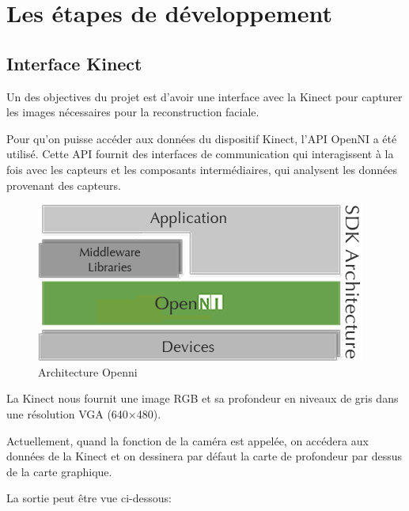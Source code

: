 \documentclass[a4paper,11pt]{article}
\begin{document}
\section{Les étapes de développement}
\subsection*{Interface Kinect}

Un des objectives du projet est d’avoir une interface avec la Kinect pour capturer les images nécessaires pour la reconstruction faciale.

Pour qu’on puisse accéder aux données du dispositif Kinect, l’API OpenNI\cite{Openni2010} a été utilisé. Cette API fournit des interfaces de communication qui interagissent à la fois avec les capteurs et les composants intermédiaires, qui analysent les données provenant des capteurs.

\begin{figure}[h!]
  \begin{center}
    \includegraphics[scale=0.4]{img/image03.png}
    \caption{Architecture Openni}
  \end{center}
\end{figure}


La Kinect nous fournit une image RGB et sa profondeur en niveaux de gris dans une résolution VGA (640×480).

Actuellement, quand la fonction de la caméra est appelée, on accédera aux données de la Kinect et on dessinera par défaut la carte de profondeur par dessus de la carte graphique. 



La sortie peut être vue ci-dessous:
\end{document}
